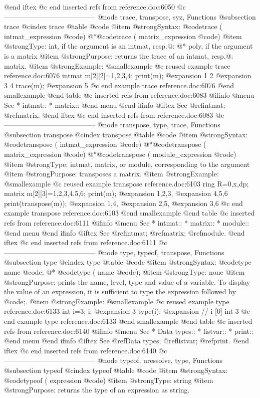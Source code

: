 {{{{{{{@end iftex
@c end inserted refs from reference.doc:6050
@c ---------------------------------------
@node trace, transpose, syz, Functions
@subsection trace
@cindex trace
@table @code
@item @strong{Syntax:}
@code{trace (} intmat_expression @code{)}
@*@code{trace (} matrix_expression @code{)}
@item @strong{Type:}
int, if the argument is an intmat, resp.@: @*
poly, if the argument is a matrix
@item @strong{Purpose:}
returns the trace of an intmat, resp.@: matrix.
@item @strong{Example:}
@smallexample
@c reused example trace reference.doc:6076 
  intmat m[2][2]=1,2,3,4;
  print(m);
@expansion{}      1     2
@expansion{}      3     4
  trace(m);
@expansion{} 5
@c end example trace reference.doc:6076
@end smallexample
@end table
@c inserted refs from reference.doc:6083
@ifinfo
@menu
See
* intmat::
* matrix::
@end menu
@end ifinfo
@iftex
See
@ref{intmat};
@ref{matrix}.
@end iftex
@c end inserted refs from reference.doc:6083
@c ---------------------------------------
@node transpose, type, trace, Functions
@subsection transpose
@cindex transpose
@table @code
@item @strong{Syntax:}
@code{transpose (} intmat_expression @code{)}
@*@code{transpose (} matrix_expression @code{)}
@*@code{transpose (} module_expression @code{)}
@item @strong{Type:}
intmat, matrix, or module, corresponding to the argument
@item @strong{Purpose:}
transposes a matrix.
@item @strong{Example:}
@smallexample
@c reused example transpose reference.doc:6103 
  ring R=0,x,dp;
  matrix m[2][3]=1,2,3,4,5,6;
  print(m);
@expansion{} 1,2,3,
@expansion{} 4,5,6 
  print(transpose(m));
@expansion{} 1,4,
@expansion{} 2,5,
@expansion{} 3,6 
@c end example transpose reference.doc:6103
@end smallexample
@end table
@c inserted refs from reference.doc:6111
@ifinfo
@menu
See
* intmat::
* matrix::
* module::
@end menu
@end ifinfo
@iftex
See
@ref{intmat};
@ref{matrix};
@ref{module}.
@end iftex
@c end inserted refs from reference.doc:6111
@c ---------------------------------------
@node type, typeof, transpose, Functions
@subsection type
@cindex type
@table @code
@item @strong{Syntax:}
@code{type } name @code{;} @*
@code{type (} name @code{);}
@item @strong{Type:}
none
@item @strong{Purpose:}
prints the name, level, type and value of a variable. To display the
value of an expression, it is sufficient to type the expression followed
by @code{;}.
@item @strong{Example:}
@smallexample
@c reused example type reference.doc:6133 
  int i=3;
  i;
@expansion{} 3
  type(i);
@expansion{} // i                    [0]  int 3
@c end example type reference.doc:6133
@end smallexample
@end table
@c inserted refs from reference.doc:6140
@ifinfo
@menu
See
* Data types::
* listvar::
* print::
@end menu
@end ifinfo
@iftex
See
@ref{Data types};
@ref{listvar};
@ref{print}.
@end iftex
@c end inserted refs from reference.doc:6140
@c ---------------------------------------
@node typeof, uressolve, type, Functions
@subsection typeof
@cindex typeof
@table @code
@item @strong{Syntax:}
@code{typeof (} expression @code{)}
@item @strong{Type:}
string
@item @strong{Purpose:}
returns the type of an expression as string.

}}}}}}}
